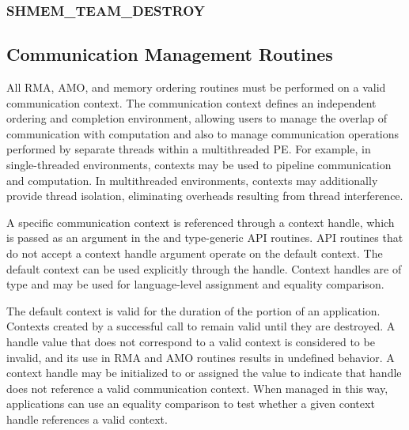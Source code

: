 \documentclass[10pt]{book}
\begin{document}
\subsubsection{\textbf{SHMEM\_TEAM\_DESTROY}}\label{subsec:shmem_team_destroy}




\subsection{Communication Management Routines}
\label{sec:ctx}
All \openshmem \ac{RMA}, \ac{AMO}, and memory ordering routines must be
performed on a valid communication context.  The communication context defines an
independent ordering and completion environment, allowing users to manage the
overlap of communication with computation and also to manage communication
operations performed by separate threads within a multithreaded \ac{PE}.  For
example, in single-threaded environments, contexts may be used to pipeline
communication and computation.  In multithreaded environments, contexts may
additionally provide thread isolation, eliminating overheads resulting from
thread interference.

A specific communication context is referenced through a context handle, which is
passed as an argument in the \Cstd {} and type-generic \ac{API}
routines.  \ac{API} routines that do not accept a context handle argument operate on the
default context.  The default context can be used explicitly through the
 handle.
Context handles are of type  and may be used for
language-level assignment and equality comparison.

The default context is valid for the duration of the \openshmem portion of
an application.
Contexts created by a successful call to  remain
valid until they are destroyed.
A handle value that does not correspond to a valid context is considered
to be invalid, and its use in \ac{RMA} and \ac{AMO} routines results in
undefined behavior.
A context handle may be initialized to or assigned the value
 to indicate that handle does not reference a
valid communication context.
When managed in this way, applications can use an equality comparison
to test whether a given context handle references a valid context.
\end{document}
